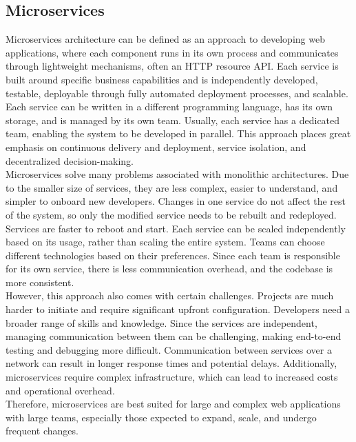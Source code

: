 \subsection{Microservices}
Microservices architecture can be defined as an approach to developing web applications, where each component runs in its own process and communicates through lightweight mechanisms, often an HTTP resource API. Each service is built around specific business capabilities and is independently developed, testable, deployable through fully automated deployment processes, and scalable. Each service can be written in a different programming language, has its own storage, and is managed by its own team. Usually, each service has a dedicated team, enabling the system to be developed in parallel. This approach places great emphasis on continuous delivery and deployment, service isolation, and decentralized decision-making. \\

\noindent
Microservices solve many problems associated with monolithic architectures. Due to the smaller size of services, they are less complex, easier to understand, and simpler to onboard new developers. Changes in one service do not affect the rest of the system, so only the modified service needs to be rebuilt and redeployed. Services are faster to reboot and start. Each service can be scaled independently based on its usage, rather than scaling the entire system. Teams can choose different technologies based on their preferences. Since each team is responsible for its own service, there is less communication overhead, and the codebase is more consistent. \\

\noindent
However, this approach also comes with certain challenges. Projects are much harder to initiate and require significant upfront configuration. Developers need a broader range of skills and knowledge. Since the services are independent, managing communication between them can be challenging, making end-to-end testing and debugging more difficult. Communication between services over a network can result in longer response times and potential delays. Additionally, microservices require complex infrastructure, which can lead to increased costs and operational overhead. \\

\noindent
Therefore, microservices are best suited for large and complex web applications with large teams, especially those expected to expand, scale, and undergo frequent changes. \cite{Fowler}\cite{Peltonen}